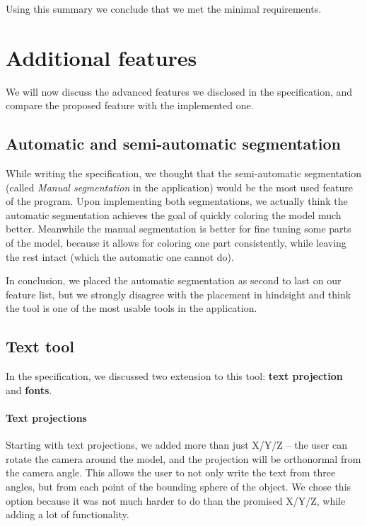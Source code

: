 Using this summary we conclude that we met the minimal requirements.

\section{Additional features}

We will now discuss the advanced features we disclosed in the specification, and compare the proposed feature with the implemented one.

\subsection{Automatic and semi-automatic segmentation}

While writing the specification, we thought that the semi-automatic segmentation (called \textit{Manual segmentation} in the application) would be the most used feature of the program. Upon implementing both segmentations, we actually think the automatic segmentation achieves the goal of quickly coloring the model much better. Meanwhile the manual segmentation is better for fine tuning some parts of the model, because it allows for coloring one part consistently, while leaving the rest intact (which the automatic one cannot do).

In conclusion, we placed the automatic segmentation as second to last on our feature list, but we strongly disagree with the placement in hindsight and think the tool is one of the most usable tools in the application.

\subsection{Text tool}

In the specification, we discussed two extension to this tool: \textbf{text projection} and \textbf{fonts}.

\paragraph{Text projections}

Starting with text projections, we added more than just X/Y/Z -- the user can rotate the camera around the model, and the projection will be orthonormal from the camera angle. This allows the user to not only write the text from three angles, but from each point of the bounding sphere of the object. We chose this option because it was not much harder to do than the promised X/Y/Z, while adding a lot of functionality.

